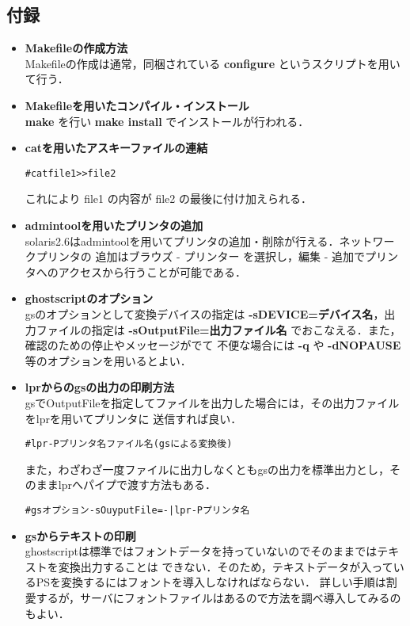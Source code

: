 \documentclass[a4j]{jarticle}
\begin{document}
\subsection*{付録}
\begin{itemize}
\item {\bf Makefileの作成方法}\\
Makefileの作成は通常，同梱されている {\bf configure} というスクリプトを用いて行う．
\item {\bf Makefileを用いたコンパイル・インストール}\\
{\bf make} を行い {\bf make install} でインストールが行われる．
\item {\bf catを用いたアスキーファイルの連結}
\begin{center}
\begin{breakbox}
\begin{alltt}
#cat file1 >> file2  
\end{alltt}
\end{breakbox}
\end{center}
これにより file1 の内容が file2 の最後に付け加えられる．
\item {\bf admintoolを用いたプリンタの追加}\\
solaris2.6はadmintoolを用いてプリンタの追加・削除が行える．ネットワークプリンタの
追加はブラウズ - プリンター を選択し，編集 - 追加でプリンタへのアクセスから行うことが可能である．
\item {\bf ghostscriptのオプション}\\
gsのオプションとして変換デバイスの指定は {\bf -sDEVICE=デバイス名}，出力ファイルの指定は
 {\bf -sOutputFile=出力ファイル名} でおこなえる．また，確認のための停止やメッセージがでて
不便な場合には {\bf -q} や {\bf -dNOPAUSE} 等のオプションを用いるとよい．
\item {\bf lprからのgsの出力の印刷方法}\\
gsでOutputFileを指定してファイルを出力した場合には，その出力ファイルをlprを用いてプリンタに
送信すれば良い．
\begin{center}
\begin{breakbox}
\begin{alltt}
#lpr -Pプリンタ名 ファイル名(gsによる変換後)
\end{alltt}
\end{breakbox}
\end{center}
また，わざわざ一度ファイルに出力しなくともgsの出力を標準出力とし，そのままlprへパイプで渡す方法もある．
\begin{center}
\begin{breakbox}
\begin{alltt}
#gs オプション -sOuyputFile=- | lpr -Pプリンタ名
\end{alltt}
\end{breakbox}
\end{center}
\item {\bf gsからテキストの印刷}\\
ghostscriptは標準ではフォントデータを持っていないのでそのままではテキストを変換出力することは
できない．そのため，テキストデータが入っているPSを変換するにはフォントを導入しなければならない．
詳しい手順は割愛するが，サーバにフォントファイルはあるので方法を調べ導入してみるのもよい．
\end{itemize}
\end{document}
